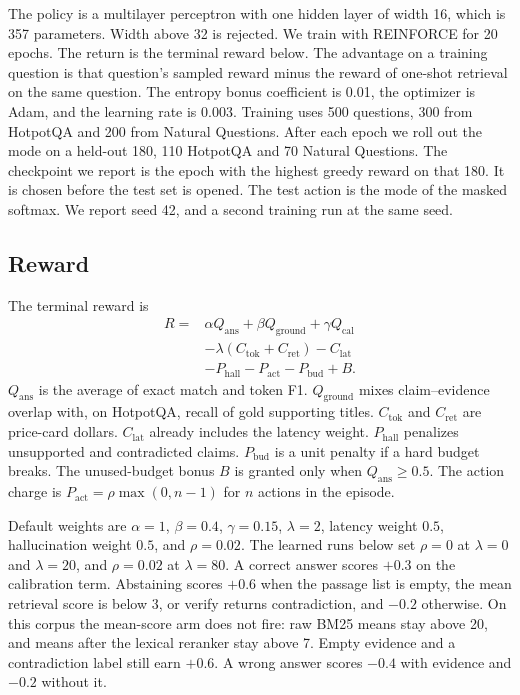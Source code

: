 \documentclass[letterpaper]{article} %
\begin{document}
The policy is a multilayer perceptron with one hidden layer of width 16, which is 357 parameters. Width above 32 is rejected. We train with REINFORCE \cite{williams1992reinforce} for 20 epochs. The return is the terminal reward below. The advantage on a training question is that question's sampled reward minus the reward of one-shot retrieval on the same question. The entropy bonus coefficient is 0.01, the optimizer is Adam, and the learning rate is 0.003. Training uses 500 questions, 300 from HotpotQA and 200 from Natural Questions. After each epoch we roll out the mode on a held-out 180, 110 HotpotQA and 70 Natural Questions. The checkpoint we report is the epoch with the highest greedy reward on that 180. It is chosen before the test set is opened. The test action is the mode of the masked softmax. We report seed 42, and a second training run at the same seed.

\subsection{Reward}
The terminal reward is
\begin{equation}
\begin{aligned}
R = {} & \alpha Q_{\mathrm{ans}} + \beta Q_{\mathrm{ground}} + \gamma Q_{\mathrm{cal}} \\
& - \lambda (C_{\mathrm{tok}} + C_{\mathrm{ret}}) - C_{\mathrm{lat}} \\
& - P_{\mathrm{hall}} - P_{\mathrm{act}} - P_{\mathrm{bud}} + B.
\end{aligned}
\label{eq:reward}
\end{equation}
\(Q_{\mathrm{ans}}\) is the average of exact match and token F1. \(Q_{\mathrm{ground}}\) mixes claim--evidence overlap with, on HotpotQA, recall of gold supporting titles. \(C_{\mathrm{tok}}\) and \(C_{\mathrm{ret}}\) are price-card dollars. \(C_{\mathrm{lat}}\) already includes the latency weight. \(P_{\mathrm{hall}}\) penalizes unsupported and contradicted claims. \(P_{\mathrm{bud}}\) is a unit penalty if a hard budget breaks. The unused-budget bonus \(B\) is granted only when \(Q_{\mathrm{ans}} \ge 0.5\). The action charge is \(P_{\mathrm{act}} = \rho \max(0, n-1)\) for \(n\) actions in the episode.

Default weights are \(\alpha{=}1\), \(\beta{=}0.4\), \(\gamma{=}0.15\), \(\lambda{=}2\), latency weight \(0.5\), hallucination weight \(0.5\), and \(\rho{=}0.02\). The learned runs below set \(\rho{=}0\) at \(\lambda{=}0\) and \(\lambda{=}20\), and \(\rho{=}0.02\) at \(\lambda{=}80\). A correct answer scores \(+0.3\) on the calibration term. Abstaining scores \(+0.6\) when the passage list is empty, the mean retrieval score is below 3, or verify returns contradiction, and \(-0.2\) otherwise. On this corpus the mean-score arm does not fire: raw BM25 means stay above 20, and means after the lexical reranker stay above 7. Empty evidence and a contradiction label still earn \(+0.6\). A wrong answer scores \(-0.4\) with evidence and \(-0.2\) without it.
\end{document}

